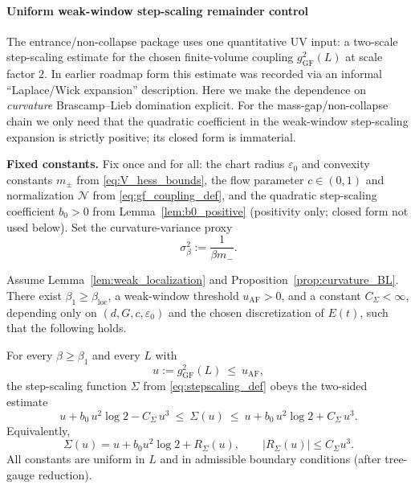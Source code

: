 \paragraph*{Uniform weak-window step-scaling remainder control}
\label{subsec:hardened44_stepscaling_remainder}

The entrance/non-collapse package uses one quantitative UV input: a two-scale step-scaling estimate for the chosen finite-volume
coupling $g^2_{\mathrm{GF}}(L)$ at scale factor $2$.
In earlier roadmap form this estimate was recorded via an informal ``Laplace/Wick expansion'' description.
Here we make the dependence on \emph{curvature} Brascamp--Lieb domination explicit.
For the mass-gap/non-collapse chain we only need that the quadratic coefficient in the weak-window step-scaling expansion is strictly
positive; its closed form is immaterial.

\medskip
\noindent
\textbf{Fixed constants.}
Fix once and for all: the chart radius $\varepsilon_0$ and convexity constants $m_\pm$ from \eqref{eq:V_hess_bounds},
the flow parameter $c\in(0,1)$ and normalization $\mathcal N$ from \eqref{eq:gf_coupling_def},
and the quadratic step-scaling coefficient $b_0>0$ from Lemma~\ref{lem:b0_positive} (positivity only; closed form not used below).
Set the curvature-variance proxy
\begin{equation}\label{eq:h44_sigma_def}
\sigma_\beta^2:=\frac{1}{\beta m_-}.
\end{equation}

\begin{lemma}
\label{lem:flow_energy_expansion}
Assume Lemma~\ref{lem:weak_localization} and Proposition~\ref{prop:curvature_BL}.
There exist $\beta_1\ge\beta_{\mathrm{loc}}$, a weak-window threshold $u_{\mathrm{AF}}>0$, and a constant $C_{\Sigma}<\infty$,
depending only on $(d,G,c,\varepsilon_0)$ and the chosen discretization of $E(t)$, such that the following holds.

\smallskip
\noindent
For every $\beta\ge\beta_1$ and every $L$ with
\[
u:=g^2_{\mathrm{GF}}(L)\ \le\ u_{\mathrm{AF}},
\]
the step-scaling function $\Sigma$ from \eqref{eq:stepscaling_def} obeys the two-sided estimate
\begin{equation}\label{eq:h44_stepscaling_two_sided}
u + b_0\,u^2\log 2 - C_{\Sigma}\,u^3
\ \le\ \Sigma(u)\ \le\
u + b_0\,u^2\log 2 + C_{\Sigma}\,u^3.
\end{equation}
Equivalently,
\[
\Sigma(u)=u+b_0u^2\log 2 + R_{\Sigma}(u),
\qquad |R_{\Sigma}(u)|\le C_{\Sigma}u^3.
\]
All constants are uniform in $L$ and in admissible boundary conditions (after tree-gauge reduction).
\end{lemma}

